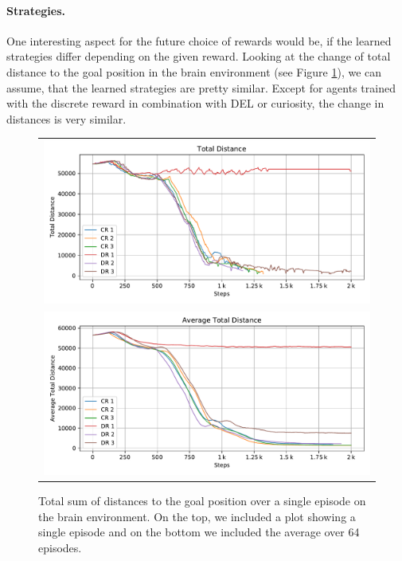 \paragraph{Strategies.}
One interesting aspect for the future choice of rewards would be, if the learned strategies differ depending on the given reward. Looking at the change of total distance to the goal position in the brain environment (see Figure \ref{fig:Rewards/Ep_Analysis}), we can assume, that the learned strategies are pretty similar. Except for agents trained with the discrete reward in combination with DEL or curiosity, the change in distances is very similar.  

\begin{figure}[htp]
    \begin{center}
        \begin{tabular}{c}
            \includegraphics[clip, width=0.95\columnwidth]{figures/evaluation/rewards/episode_analysis/maze0122_total_dist.pdf} \\
            \includegraphics[clip, width=0.95\columnwidth]{figures/evaluation/rewards/episode_analysis/maze0122_total_dist_avg.pdf} \\
        \end{tabular}
    \end{center}
    \caption[Episode metrics on the Brain Environment]{Total sum of distances to the goal position over a single episode on the brain environment. On the top, we included a plot showing a single episode and on the bottom we included the average over 64 episodes.} \label{fig:Rewards/Ep_Analysis}
\end{figure}

